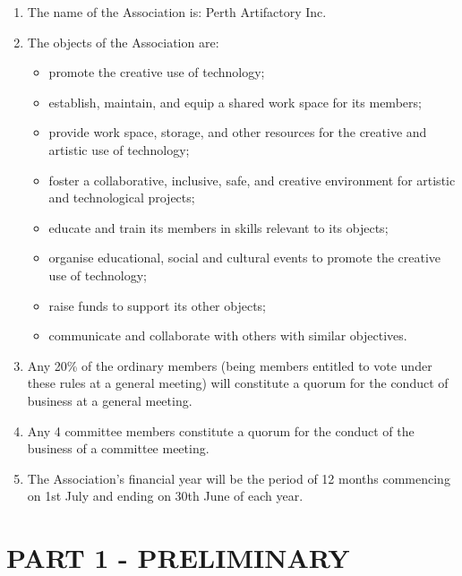 \documentclass[../constitution.tex]{subfiles}
\begin{document}

\begin{enumerate}[label=\Alph*.]
  \item The name of the Association is: Perth Artifactory Inc.
  \item The objects of the Association are:
    \begin{itemize}
    \item promote the creative use of technology;
    \item establish, maintain, and equip a shared work space for its members;
    \item provide work space, storage, and other resources for the creative and artistic use of technology;
    \item foster a collaborative, inclusive, safe, and creative environment for artistic and technological projects;
    \item educate and train its members in skills relevant to its objects;
    \item organise educational, social and cultural events to promote the creative use of technology;
    \item raise funds to support its other objects;
    \item communicate and collaborate with others with similar objectives.
    \end{itemize}
  \item Any 20\% of the ordinary members (being members entitled to vote under these rules at a general meeting) will constitute a quorum for the conduct of business at a general meeting.
  \item Any 4 committee members constitute a quorum for the conduct of the business of a committee meeting.
  \item The Association's financial year will be the period of 12 months commencing on 1st July and ending on 30th June of each year.
\end{enumerate}




\part{PART 1 - PRELIMINARY} \label{part-1---preliminary}
\end{document}
